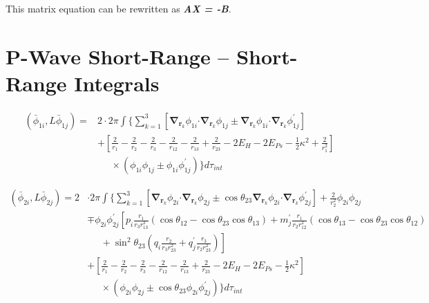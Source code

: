 \documentclass[Dissertation.tex]{subfiles}
\begin{document}
\noindent This matrix equation can be rewritten as
\beq
\textbf{\emph{AX = -B}}.
\eeq



\section{P-Wave Short-Range -- Short-Range Integrals}
\label{sec:PWaveShortShort}

\begin{align}
\label{eq:PWavePhi1Phi1}
\left(\bar{\phi}_{1i},L \bar{\phi}_{1j}\right) = &2 \cdot 2\pi \int{ \Bigg\{ \sum_{k=1}^3 \left[ \boldsymbol{\nabla}_{\!\mathbf{r}_k} \nonumber \phi_{1i} \boldsymbol{\cdot} \boldsymbol{\nabla}_{\!\mathbf{r}_k} \phi_{1j} \pm \boldsymbol{\nabla}_{\!\mathbf{r}_k} \phi_{1i} \boldsymbol{\cdot} \boldsymbol{\nabla}_{\!\mathbf{r}_k} \phi_{1j}^\prime \right] } \\
\nonumber  &+ \left. \left[\frac{2}{r_1} - \frac{2}{r_2} - \frac{2}{r_3} - \frac{2}{r_{12}} - \frac{2}{r_{13}} + \frac{2}{r_{23}} - 2 E_H - 2 E_{Ps} - \frac{1}{2}\kappa^2 + \frac{2}{r_1^2} \right] \right. \\
 &\;\;\;\;\; \times \left(\phi_{1i} \phi_{1j} \pm \phi_{1i} \phi_{1j}^\prime \right) \Bigg\} d\tau_{int}
\end{align}

\begin{align}
\label{eq:PWavePhi2Phi2}
\left(\bar{\phi}_{2i},L \bar{\phi}_{2j}\right) = 2 & \cdot 2\pi \int \Bigg\{ \sum_{k=1}^3 \left[ \boldsymbol{\nabla}_{\!\mathbf{r}_k} \nonumber \phi_{2i} \boldsymbol{\cdot} \boldsymbol{\nabla}_{\!\mathbf{r}_k} \phi_{2j} \pm \cos\theta_{23} \boldsymbol{\nabla}_{\!\mathbf{r}_k} \phi_{2i} \boldsymbol{\cdot} \boldsymbol{\nabla}_{\!\mathbf{r}_k} \phi_{2j}^\prime \right]  + \frac{2}{r_2^2}\phi_{2i}\phi_{2j} \\
 \nonumber &\mp \phi_{2i} \phi_{2j}^\prime \left[p_i \frac{r_1}{r_3 r_{13}^2} (\cos\theta_{12} - \cos\theta_{23} \cos\theta_{13}) + m_j^\prime \frac{r_1}{r_2 r_{12}^2}(\cos\theta_{13}-\cos\theta_{23} \cos\theta_{12})\right.\\
 \nonumber & \left. \;\;\;\;\;  + \sin^2\theta_{23} \left(q_i \frac{r_2}{r_3 r_{23}^2} + q_j^\prime \frac{r_3}{r_2 r_{23}^2} \right) \right] \\
 \nonumber &+ \left. \left[\frac{2}{r_1} - \frac{2}{r_2} - \frac{2}{r_3} - \frac{2}{r_{12}} - \frac{2}{r_{13}} + \frac{2}{r_{23}} - 2 E_H - 2 E_{Ps} - \frac{1}{2}\kappa^2 \right] \right. \\
 &\;\;\;\;\; \times \left(\phi_{2i} \phi_{2j} \pm \cos\theta_{23} \phi_{2i} \phi_{2j}^\prime \right) \Bigg\} d\tau_{int}
\end{align}
\end{document}
